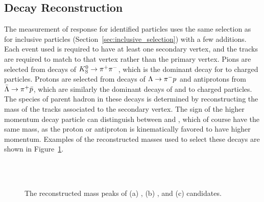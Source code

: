 \subsection{Decay Reconstruction}
The measurement of response for identified particles uses the same selection as for inclusive particles (Section~\ref{sec:inclusive_selection}) with a few additions.
Each event used is required to have at least one secondary vertex, and the tracks are required to match to that vertex rather than the primary vertex.
Pions are selected from decays of $K_\text{S}^{0} \rightarrow \pi^+ \pi^-$, which is the dominant decay for \pKS to charged particles.
Protons are selected from decays of $\Lambda \rightarrow \pi^- p$ and antiprotons from $\bar{\Lambda} \rightarrow \pi^+ \bar{p}$, which are similarly the dominant decays of \pL and \pLB to charged particles.
The species of parent hadron in these decays is determined by reconstructing the mass of the tracks associated to the secondary vertex.
The sign of the higher momentum decay particle can distinguish between \pL and \pLB, which of course have the same mass, as the proton or antiproton is kinematically favored to have higher momentum.
Examples of the reconstructed masses used to select these decays are shown in Figure~\ref{fig:identified_mass}. 

\begin{figure}[htbp]
\centering
{}
\\
~
\caption{The reconstructed mass peaks of (a) \pKS, (b) \pL, and (c) \pLB candidates.}
\label{fig:identified_mass}
\end{figure}

